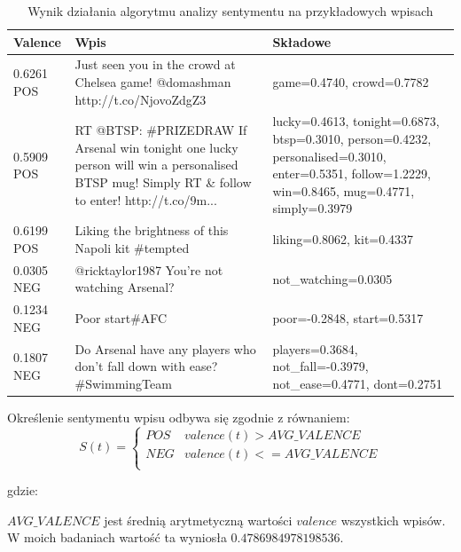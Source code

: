 \begin{table}[ht!]
\begin{center}  
\begin{tabular}{|p{12mm}|p{70mm}|>{\raggedright\arraybackslash}p{60mm}|}
\hline
Valence & Wpis & Składowe 
\\ \hline 
0.6261 POS & Just seen you in the crowd at Chelsea game! @domashman http://t.co/NjovoZdgZ3 & {game=0.4740, crowd=0.7782}
\\ \hline
0.5909 POS & RT @BTSP: \#PRIZEDRAW If Arsenal win tonight one lucky person
will win a personalised BTSP mug! Simply RT \& follow to enter!
http://t.co/9m... & {lucky=0.4613, tonight=0.6873, btsp=0.3010, person=0.4232, personalised=0.3010, enter=0.5351, follow=1.2229, win=0.8465, mug=0.4771, simply=0.3979}
\\ \hline
0.6199 POS & Liking the brightness of this Napoli kit \#tempted &
{liking=0.8062, kit=0.4337} \\ \hline
0.0305 NEG & @ricktaylor1987 You're not watching Arsenal? &
{not\_watching=0.0305} \\ \hline
0.1234 NEG & Poor start\#AFC & {poor=-0.2848, start=0.5317}
\\ \hline
0.1807 NEG & Do Arsenal have any players who don't fall down with ease?
\#SwimmingTeam & {players=0.3684, not\_fall=-0.3979, not\_ease=0.4771,
dont=0.2751} \\ \hline
\end{tabular} 
\end{center} 
\caption{Wynik działania algorytmu analizy sentymentu na przykładowych wpisach}
\label{tab:valence-przyklad}
\end{table}

Określenie sentymentu wpisu odbywa się zgodnie z równaniem:
\begin{equation}
S(t) =
\begin{cases}
POS & valence(t) > AVG\_VALENCE \\
NEG & valence(t) <= AVG\_VALENCE \\
\end{cases}
\end{equation}

gdzie:

$AVG\_VALENCE$ jest średnią arytmetyczną wartości $valence$
wszystkich wpisów. W moich badaniach wartość ta wyniosła $0.4786984978198536$.

